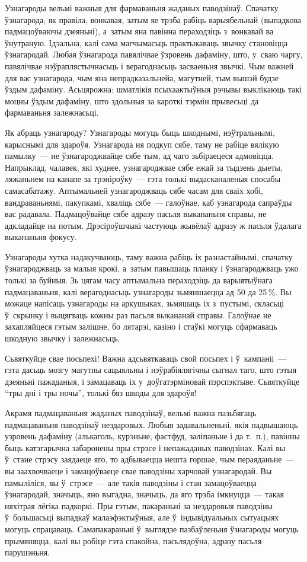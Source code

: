Узнагароды вельмі важныя для фармаваньня жаданых паводзінаў. Спачатку ўзнагарода, як правіла, вонкавая, затым яе трэба рабіць варыябельнай (выпадкова падмацоўваючы дзеяньні), а~затым яна павінна пераходзіць з~вонкавай ва ўнутраную. Ідэальна, калі сама магчымасьць практыкаваць звычку становіцца ўзнагародай. Любая ўзнагарода павялічвае ўзровень дафаміну, што, у~сваю чаргу, павялічвае нэўраплястычнасьць і верагоднасьць засваеньня звычкі. Чым важней для вас узнагарода, чым яна непрадказальнейа, магутней, тым вышэй будзе ўздым дафаміну. Асьцярожна: шматлікія псыхаактыўныя рэчывы выклікаюць такі моцны ўздым дафаміну, што здольныя за кароткі тэрмін прывесьці да фармаваньня залежнасьці.

Як абраць узнагароду? Узнагароды могуць быць шкоднымі, нэўтральнымі, карыснымі для здароўя. Узнагарода ня подкуп сябе, таму не рабіце вялікую памылку~--- не ўзнагароджвайце сябе тым, ад чаго зьбіраецеся адмовіцца. Напрыклад, чалавек, які худнее, узнагароджвае сябе ежай за тыдзень дыеты, ляжаньнем на канапе за трэніроўку~--- гэта толькі выдасканаленыя спосабы самасабатажу. Аптымальней узнагароджваць сябе часам для сваіх хобі, вандраваньнямі, пакупкамі, хваліць сябе~--- галоўнае, каб узнагарода сапраўды вас радавала. Падмацоўвайце сябе адразу пасьля выкананьня справы, не адкладайце на потым. Дрэсіроўшчыкі частуюць жывёлаў адразу ж пасьля ўдалага выкананьня фокусу.

Узнагароды хутка надакучваюць, таму важна рабіць іх разнастайнымі, спачатку ўзнагароджваць за малыя крокі, а~затым павышаць планку і ўзнагароджваць ужо толькі за буйныя. Зь цягам часу аптымальна пераходзіць да варыятыўнага падмацаваньня, калі верагоднасьць узнагароды зьмяншаецца ад 50 да 25\,\%. Вы можаце напісаць узнагароды на аркушыках, зьмяшаць іх з~пустымі, скласьці ў~скрынку і выцягваць кожны раз пасьля выкананай справы. Галоўнае не захапляйцеся гэтым залішне, бо лятарэі, казіно і стаўкі могуць сфармаваць шкодную звычку і залежнасьць.

Сьвяткуйце свае посьпехі! Важна адсьвяткаваць свой посьпех і ў~кампаніі~--- гэта дасьць мозгу магутны сацыяльны і нэўрабіялягічны сыгнал таго, што гэтыя дзеяньні пажаданыя, і замацаваць іх у~доўгатэрміновай пэрспэктыве. Сьвяткуйце ``тры дні і тры ночы'', толькі бяз шкоды для здароўя!

Акрамя падмацаваньня жаданых паводзінаў, вельмі важна пазьбягаць падмацаваньня паводзінаў нездаровых. Любыя задавальненьні, якія падвышаюць узровень дафаміну (алькаголь, курэньне, фастфуд, заліпаньне і да т.~п.), павінны быць катэгарычна забаронены пры стрэсе і непажаданых паводзінах. Калі вы ў~стане стрэсу заядаеце яго, то адбываецца нешта горшае, чым пераяданьне~--- вы заахвочваеце і замацоўваеце свае паводзіны харчовай узнагародай. Вы памыліліся, вы ў~стрэсе~--- але такія паводзіны і стан замацоўваецца ўзнагародай, значыць, яно выгадна, значыць, да яго трэба імкнуцца~--- такая няхітрая лёгіка падкоркі. Пры гэтым, пакараньні за нездаровыя паводзіны ў~большасьці выпадкаў малаэфэктыўныя, але ў~індывідуальных сытуацыях могуць спрацаваць. Самапакараньні ў~выглядзе пазбаўленьня ўзнагароды могуць прымяняцца, калі вы робіце гэта спакойна, пасьлядоўна, адразу пасьля парушэньня.

